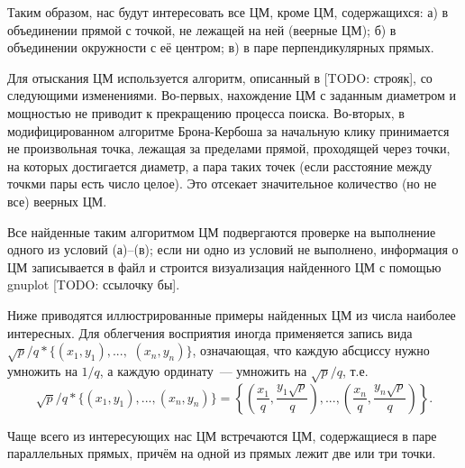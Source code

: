 \documentclass[12pt]{article}
\begin{document}
Таким образом, нас будут интересовать все ЦМ, кроме ЦМ, содержащихся:
а) в объединении прямой с точкой, не лежащей на ней (веерные ЦМ);
б) в объединении окружности с её центром;
в) в паре перпендикулярных прямых.

Для отыскания ЦМ используется алгоритм, описанный в [TODO: строяк],
со следующими изменениями.
Во-первых, нахождение ЦМ с заданным диаметром и мощностью не приводит к прекращению процесса поиска.
Во-вторых, в модифицированном алгоритме Брона-Кербоша за начальную клику
принимается не произвольная точка, лежащая за пределами прямой, проходящей через точки,
на которых достигается диаметр, а пара таких точек (если расстояние между точкми пары есть число целое).
Это отсекает значительное количество (но не все) веерных ЦМ.

Все найденные таким алгоритмом ЦМ подвергаются проверке на выполнение одного из условий (а)--(в);
если ни одно из условий не выполнено, информация о ЦМ записывается в файл и строится визуализация найденного ЦМ с помощью gnuplot
[TODO: ссылочку бы].

Ниже приводятся иллюстрированные примеры найденных ЦМ из числа наиболее интересных.
Для облегчения восприятия иногда применяется запись вида
$\sqrt{p}/q * \{ (x_1,y_1), ...,$ $ (x_n, y_n)  \}$,
означающая, что каждую абсциссу нужно умножить на $1/q$,
а каждую ординату~--- умножить на $\sqrt{p}/q$, т.е.
$$
	\sqrt{p}/q * \{ (x_1,y_1), ..., (x_n, y_n)  \}
	=
	\left\{ \left(\frac{x_1}{q},\frac{y_1\sqrt{p}}{q}\right), ..., \left(\frac{x_n}{q},\frac{y_n\sqrt{p}}{q}\right)  \right\}
	.
$$

Чаще всего из интересующих нас ЦМ встречаются ЦМ, содержащиеся в паре параллельных прямых,
причём на одной из прямых лежит две или три точки.
\end{document}
